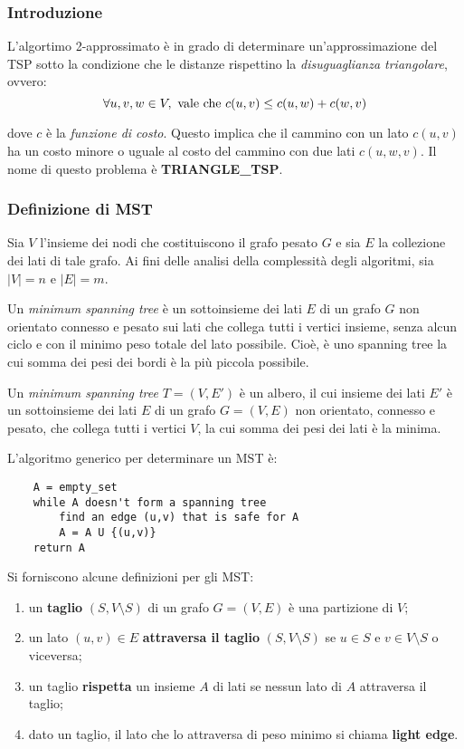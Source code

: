 \subsubsection{Introduzione}

L'algortimo 2-approssimato è in grado di determinare un'approssimazione del TSP sotto la condizione che le
distanze rispettino la \textit{disuguaglianza triangolare}, ovvero:
\begin{equation}
    \forall u, v, w \in V, \textnormal{ vale che } c(u, v) \le c(u, w) + c(w, v)
\end{equation}

dove $c$ è la \textit{funzione di costo}. Questo implica che il cammino con un lato $c(u, v)$ ha un costo
minore o uguale al costo del cammino con due lati $c(u, w, v)$. Il nome di questo problema è \textbf{TRIANGLE\_TSP}.

\subsubsection{Definizione di MST}

Sia $V$ l'insieme dei nodi che costituiscono il grafo pesato $G$ e sia $E$ la collezione dei lati di tale
grafo. Ai fini delle analisi della complessità degli algoritmi, sia $|V| = n$ e $|E| = m$.

Un \textit{minimum spanning tree} è un
sottoinsieme dei lati $E$ di un grafo $G$ non orientato connesso e pesato sui lati che
collega tutti i vertici insieme, senza alcun ciclo e con il minimo peso totale del
lato possibile. Cioè, è uno spanning tree la cui somma dei pesi dei bordi è la più
piccola possibile.

Un \textit{minimum spanning tree} $T = (V, E')$ è un albero, il cui insieme dei lati $E'$ è un
sottoinsieme dei lati $E$ di un grafo $G = (V, E)$ non orientato, connesso e
pesato, che collega tutti i vertici $V$, la cui somma dei pesi dei lati è la minima.

L'algoritmo generico per determinare un MST è:
\begin{verbatim}
    A = empty_set
    while A doesn't form a spanning tree
        find an edge (u,v) that is safe for A
        A = A U {(u,v)}
    return A
\end{verbatim}

Si forniscono alcune definizioni per gli MST:
\begin{enumerate}
    \item un \textbf{taglio} $(S, V \setminus S)$ di un grafo $G = (V, E)$ è una partizione
    di $V$;
    \item un lato $(u, v) \in E$ \textbf{attraversa il taglio} $(S, V \setminus S)$ se
    $u \in S$ e $v \in V \setminus S$ o viceversa;
    \item un taglio \textbf{rispetta} un insieme $A$ di lati se nessun lato di $A$ attraversa
    il taglio;
    \item dato un taglio, il lato che lo attraversa di peso minimo si chiama \textbf{light edge}.
\end{enumerate}

